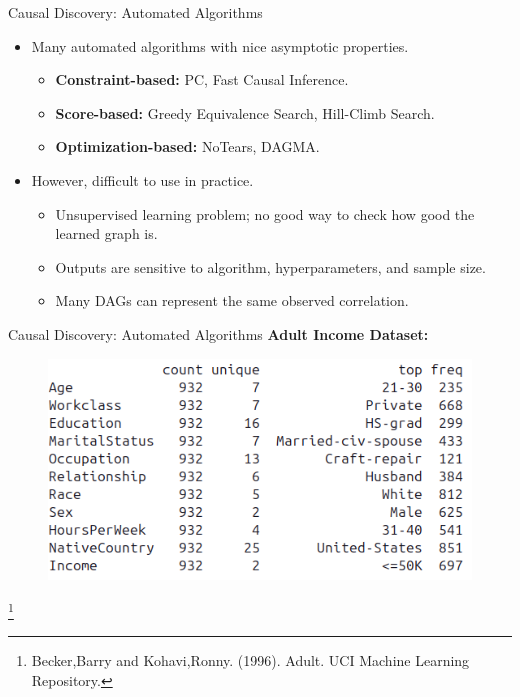 \documentclass[aspectratio=169]{beamer}
\newcommand\blfootnote[1]{
    \begingroup
    \renewcommand\thefootnote{}\footnote{#1}
    \addtocounter{footnote}{-1}
    \endgroup
}
\begin{document}
\begin{frame}{Causal Discovery: Automated Algorithms}
	\begin{itemize}
		\item Many automated algorithms with nice asymptotic properties.
			\begin{itemize}
				\item \textbf{Constraint-based:} PC, Fast Causal Inference.
				\item \textbf{Score-based:} Greedy Equivalence Search, Hill-Climb Search.
				\item \textbf{Optimization-based:} NoTears, DAGMA.
			\end{itemize}
		\item However, difficult to use in practice.
			\begin{itemize}
				\item Unsupervised learning problem; no good way to check how good the learned graph is.
				\item Outputs are sensitive to algorithm, hyperparameters, and sample size.
				\item Many DAGs can represent the same observed correlation.
			\end{itemize}
	\end{itemize}
\end{frame}

\begin{frame}{Causal Discovery: Automated Algorithms}
	\textbf{Adult Income Dataset:}
	\vspace{2em}
	\begin{figure}
		\center
		\includegraphics[scale=0.5]{imgs/adult_describe.png}
	\end{figure}
	\blfootnote{Becker,Barry and Kohavi,Ronny. (1996). Adult. UCI Machine Learning Repository.}
\end{frame}
\end{document}
